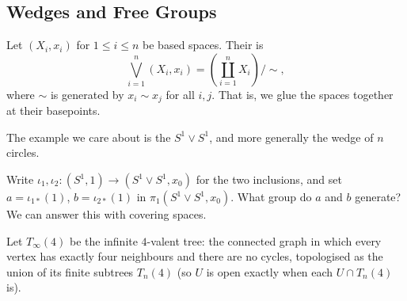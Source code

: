 \subsection{Wedges and Free Groups}

\begin{definition}[Wedge]
	Let $(X_i, x_i)$ for $1 \leq i \leq n$ be based spaces. Their  is
	$$
	\bigvee_{i=1}^n (X_i, x_i) = \left(\coprod_{i=1}^n X_i\right)\Big/\!\sim,
	$$
	where $\sim$ is generated by $x_i \sim x_j$ for all $i, j$. That is, we glue the spaces together at their basepoints.
\end{definition}

The example we care about is the  $S^1 \vee S^1$, and more generally
the wedge of $n$ circles.

\begin{center}
\end{center}

Write $\iota_1, \iota_2: (S^1, 1) \to (S^1 \vee S^1, x_0)$ for the two inclusions, and set
$a = \iota_{1*}(1)$, $b = \iota_{2*}(1)$ in $\pi_1(S^1 \vee S^1, x_0)$. What group do
$a$ and $b$ generate? We can answer this with covering spaces.

Let $T_\infty(4)$ be the infinite $4$-valent tree: the connected graph in which every
vertex has exactly four neighbours and there are no cycles, topologised as the union of
its finite subtrees $T_n(4)$ (so $U$ is open exactly when each $U \cap T_n(4)$ is).

\begin{center}
\end{center}

